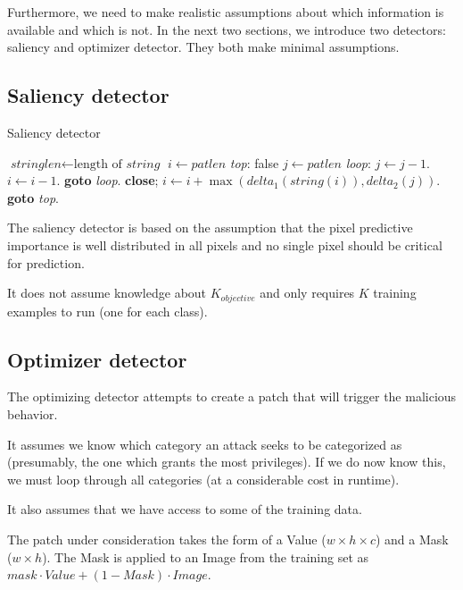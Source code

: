 \documentclass[letterpaper, 10 pt, conference]{ieeeconf}  %
\begin{document}
Furthermore, we need to make realistic assumptions about which information is available and which is not. In the next two sections, we introduce two detectors: saliency and optimizer detector. They both make minimal assumptions.

\subsection{Saliency detector}


\begin{algorithm}
\caption{Saliency detector}\label{euclid}

\begin{algorithmic}[1]
\State $\textit{stringlen} \gets \text{length of }\textit{string}$
\State $i \gets \textit{patlen}$
\BState \emph{top}:
 \Return false
\EndIf
\State $j \gets \textit{patlen}$
\BState \emph{loop}:
\State $j \gets j-1$.
\State $i \gets i-1$.
\State \textbf{goto} \emph{loop}.
\State \textbf{close};
\EndIf
\State $i \gets i+\max(\textit{delta}_1(\textit{string}(i)),\textit{delta}_2(j))$.
\State \textbf{goto} \emph{top}.
\EndProcedure
\end{algorithmic}

\end{algorithm}


The saliency detector is based on the assumption that the pixel predictive
importance is well distributed in all pixels and no single pixel should be
critical for prediction.

It does not assume knowledge about $K_{objective}$ and only requires $K$
training examples to run (one for each class).


\subsection{Optimizer detector}

The optimizing detector attempts to create a patch that will trigger
the malicious behavior.

It assumes we know which category an attack
seeks to be categorized as (presumably, the one which grants the most
privileges).  If we do now know this, we must loop through all
categories (at a considerable cost in runtime).

It also assumes that we have access to some of the training data.

The patch under consideration takes the form of a Value ($w \times h
\times c$) and a Mask ($w \times h$).  The Mask is applied to an
Image from the training set as $mask \cdot Value + (1 - Mask) \cdot
Image$.
\end{document}
